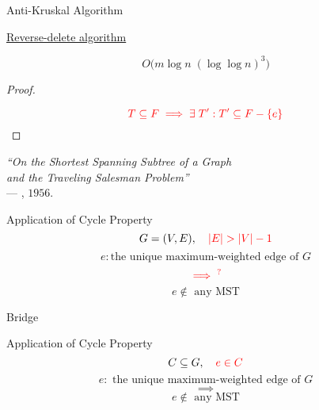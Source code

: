 \begin{frame}{}
  \begin{exampleblock}{Anti-Kruskal Algorithm}
    \centerline{\href{https://en.wikipedia.org/wiki/Reverse-delete_algorithm}{Reverse-delete algorithm }}
  \end{exampleblock}

  \pause
  \[
    O\Big(m \log n\; (\log \log n)^3\Big)
  \]

  \pause
  \begin{proof}
    \centerline{}
    \pause
    \[
      \textcolor{red}{T \subseteq F \implies \exists\; T': T' \subseteq F - \left\{e\right\}}
    \]
  \end{proof}

  \pause
  \vspace{0.20cm}
  \begin{center}
    {\it ``On the Shortest Spanning Subtree of a Graph \\
    and the Traveling Salesman Problem''} \\
    \hfill --- , $1956$.
  \end{center}
\end{frame}

\begin{frame}{}
  \begin{exampleblock}{Application of Cycle Property}
    \[
      G = (V, E), \quad \textcolor{red}{|E| > |V| - 1}
    \]
    \[
      e: \text{the unique maximum-weighted edge of } G
    \]
    \[
      \textcolor{red}{\implies^{?}} 
    \]
    \[
      e \notin \text{ any MST}
    \]
  \end{exampleblock}

  \pause
  \vspace{0.60cm}
  \centerline{\large Bridge}
\end{frame}

\begin{frame}{}
  \begin{exampleblock}{Application of Cycle Property}
    \[
      C \subseteq G, \quad \textcolor{red}{e \in C}
    \]
    \[
      e: \text{ the unique maximum-weighted edge of } G
    \]
    \[
      \implies
    \]
    \[
      e \notin \text{ any MST}
    \]
  \end{exampleblock}

  \pause
  \vspace{0.50cm}
  \centerline{}
\end{frame}

